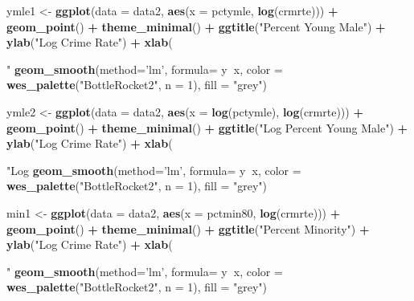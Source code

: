\documentclass[]{article}
\newenvironment{Shaded}{\begin{snugshade}}{\end{snugshade}}
\newcommand{\DataTypeTok}[1]{\textcolor[rgb]{0.13,0.29,0.53}{#1}}
\newcommand{\DecValTok}[1]{\textcolor[rgb]{0.00,0.00,0.81}{#1}}
\newcommand{\KeywordTok}[1]{\textcolor[rgb]{0.13,0.29,0.53}{\textbf{#1}}}
\newcommand{\NormalTok}[1]{#1}
\newcommand{\OperatorTok}[1]{\textcolor[rgb]{0.81,0.36,0.00}{\textbf{#1}}}
\newcommand{\StringTok}[1]{\textcolor[rgb]{0.31,0.60,0.02}{#1}}
\begin{document}
\begin{Shaded}
\begin{Highlighting}[]
\NormalTok{ymle1 <-}\StringTok{ }\KeywordTok{ggplot}\NormalTok{(}\DataTypeTok{data =}\NormalTok{ data2, }\KeywordTok{aes}\NormalTok{(}\DataTypeTok{x =}\NormalTok{ pctymle, }\KeywordTok{log}\NormalTok{(crmrte))) }\OperatorTok{+}
\StringTok{  }\KeywordTok{geom_point}\NormalTok{() }\OperatorTok{+}
\StringTok{  }\KeywordTok{theme_minimal}\NormalTok{() }\OperatorTok{+}
\StringTok{  }\KeywordTok{ggtitle}\NormalTok{(}\StringTok{"Percent Young Male"}\NormalTok{) }\OperatorTok{+}\StringTok{ }
\StringTok{  }\KeywordTok{ylab}\NormalTok{(}\StringTok{"Log Crime Rate"}\NormalTok{) }\OperatorTok{+}\StringTok{ }\KeywordTok{xlab}\NormalTok{(}\StringTok{"%
\StringTok{  }\KeywordTok{geom_smooth}\NormalTok{(}\DataTypeTok{method=}\StringTok{'lm'}\NormalTok{, }\DataTypeTok{formula=}\NormalTok{ y}\OperatorTok{~}\NormalTok{x, }\DataTypeTok{color =} \KeywordTok{wes_palette}\NormalTok{(}\StringTok{"BottleRocket2"}\NormalTok{, }\DataTypeTok{n =} \DecValTok{1}\NormalTok{), }\DataTypeTok{fill =} \StringTok{"grey"}\NormalTok{)}

\NormalTok{ymle2 <-}\StringTok{ }\KeywordTok{ggplot}\NormalTok{(}\DataTypeTok{data =}\NormalTok{ data2, }\KeywordTok{aes}\NormalTok{(}\DataTypeTok{x =} \KeywordTok{log}\NormalTok{(pctymle), }\KeywordTok{log}\NormalTok{(crmrte))) }\OperatorTok{+}
\StringTok{  }\KeywordTok{geom_point}\NormalTok{() }\OperatorTok{+}
\StringTok{  }\KeywordTok{theme_minimal}\NormalTok{() }\OperatorTok{+}
\StringTok{  }\KeywordTok{ggtitle}\NormalTok{(}\StringTok{"Log Percent Young Male"}\NormalTok{) }\OperatorTok{+}\StringTok{ }
\StringTok{  }\KeywordTok{ylab}\NormalTok{(}\StringTok{"Log Crime Rate"}\NormalTok{) }\OperatorTok{+}\StringTok{ }\KeywordTok{xlab}\NormalTok{(}\StringTok{"Log %
\StringTok{  }\KeywordTok{geom_smooth}\NormalTok{(}\DataTypeTok{method=}\StringTok{'lm'}\NormalTok{, }\DataTypeTok{formula=}\NormalTok{ y}\OperatorTok{~}\NormalTok{x, }\DataTypeTok{color =} \KeywordTok{wes_palette}\NormalTok{(}\StringTok{"BottleRocket2"}\NormalTok{, }\DataTypeTok{n =} \DecValTok{1}\NormalTok{), }\DataTypeTok{fill =} \StringTok{"grey"}\NormalTok{)}

\NormalTok{min1 <-}\StringTok{ }\KeywordTok{ggplot}\NormalTok{(}\DataTypeTok{data =}\NormalTok{ data2, }\KeywordTok{aes}\NormalTok{(}\DataTypeTok{x =}\NormalTok{ pctmin80, }\KeywordTok{log}\NormalTok{(crmrte))) }\OperatorTok{+}
\StringTok{  }\KeywordTok{geom_point}\NormalTok{() }\OperatorTok{+}
\StringTok{  }\KeywordTok{theme_minimal}\NormalTok{() }\OperatorTok{+}
\StringTok{  }\KeywordTok{ggtitle}\NormalTok{(}\StringTok{"Percent Minority"}\NormalTok{) }\OperatorTok{+}\StringTok{ }
\StringTok{  }\KeywordTok{ylab}\NormalTok{(}\StringTok{"Log Crime Rate"}\NormalTok{) }\OperatorTok{+}\StringTok{ }\KeywordTok{xlab}\NormalTok{(}\StringTok{"%
\StringTok{  }\KeywordTok{geom_smooth}\NormalTok{(}\DataTypeTok{method=}\StringTok{'lm'}\NormalTok{, }\DataTypeTok{formula=}\NormalTok{ y}\OperatorTok{~}\NormalTok{x, }\DataTypeTok{color =} \KeywordTok{wes_palette}\NormalTok{(}\StringTok{"BottleRocket2"}\NormalTok{, }\DataTypeTok{n =} \DecValTok{1}\NormalTok{), }\DataTypeTok{fill =} \StringTok{"grey"}\NormalTok{)}

}}}
\end{Highlighting}
\end{Shaded}
\end{document}
